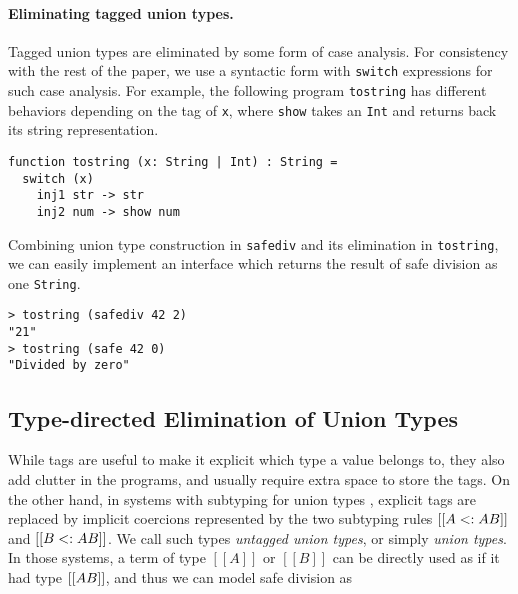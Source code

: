 \paragraph{Eliminating tagged union types.}
Tagged union types are eliminated by some form of case analysis.
For consistency with the rest of the paper, we use a syntactic form with
\lstinline{switch} expressions for such case analysis. For example,
the following program \lstinline{tostring} has different behaviors depending on the
tag of \lstinline{x}, where \lstinline{show} takes an \lstinline{Int} and
returns back its string representation.

\begin{lstlisting}
function tostring (x: String | Int) : String =
  switch (x)
    inj1 str -> str
    inj2 num -> show num
\end{lstlisting}

Combining union type construction in \lstinline{safediv} and its elimination in
\lstinline{tostring}, we can easily implement an interface which returns the
result of safe division as one \lstinline{String}.

\begin{lstlisting}
> tostring (safediv 42 2)
"21"
> tostring (safe 42 0)
"Divided by zero"
\end{lstlisting}


\subsection{Type-directed Elimination of Union Types}\label{subsec:elimination}





While tags are useful to make it explicit which type a value belongs to, they
also add clutter in the programs, and usually require extra space to store the
tags. On the other hand, in systems with subtyping for union types
\cite{dunfield2014elaborating,pierce1991programming,muehlboeck2018empowering},
explicit tags are replaced by implicit coercions represented by the two
subtyping rules $[[A <: A \/ B]]$ and $[[B <: A \/ B]]$. We call such types
\textit{untagged union types}, or simply \textit{union types}. In those systems,
a term of type $[[A]]$ or $[[B]]$ can be directly used as if it had type $[[A \/
B]]$, and thus we can model safe division as

